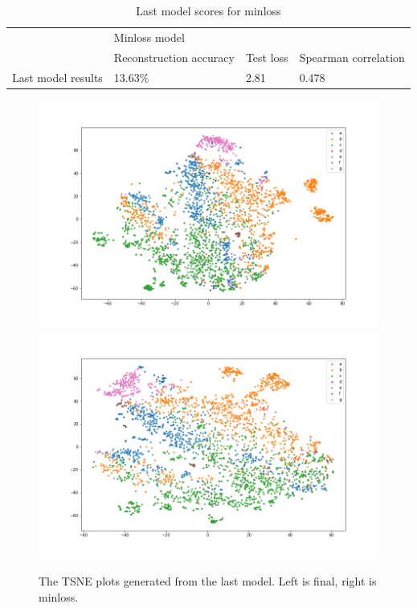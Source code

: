 \begin{table}[!ht]
\begin{tabular}{|l|lll|}
\hline
                   & Minloss model                                &                                &                      \\ \cline{2-4}
                   & \multicolumn{1}{l|}{Reconstruction accuracy} & \multicolumn{1}{l|}{Test loss} & Spearman correlation \\ \hline
Last model results & \multicolumn{1}{l|}{13.63\%}                 & \multicolumn{1}{l|}{2.81}      & 0.478                \\ \hline
\end{tabular}
\caption{Last model scores for minloss}
\label{tab:finished_results_minloss}
\end{table}


\begin{figure}[!ht]
  \centering
  \includegraphics[width=0.49\linewidth]{latex/imgs/finished_tsne_final.png}
  \includegraphics[width=0.49\linewidth]{latex/imgs/finished_tsne_minloss.png}
  \caption{The TSNE plots generated from the last model. Left is final, right is minloss.}
  \label{fig:finished_tsne}
\end{figure}

